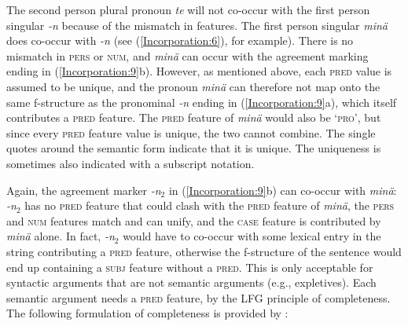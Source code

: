 \documentclass[output=paper,hidelinks]{langscibook}
\begin{document}
 \ea
 \ea\label{Incorporation:8} 
   \ex \label{8a}
\z
\z
The  second person plural pronoun \textit{te}  will not co-occur  with the  first  person  singular \textit{-n}  because of the mismatch in   features.    The first person  singular  \textit{min\"{a}} does co-occur  with \textit{-n}  (see  (\ref{Incorporation:6}), for example). There is no mismatch  in \textsc{pers}  or  \textsc{num}, and \textit{min\"{a}} can occur with   the agreement marking ending in (\ref{Incorporation:9}b).   However,    as mentioned above,  each \textsc{pred}  value    is  assumed to be unique, and  the pronoun  \textit{min\"{a}} can therefore not  map onto  the same  f-structure  as  the pronominal \textit{-n}  ending in (\ref{Incorporation:9}a), which  itself  contributes a \textsc{pred} feature.   The \textsc{pred} feature  of  \textit{min\"{a}}  would also  be \textsc{`pro'}, but   since every \textsc{pred} feature value is   unique,   the two cannot combine. The single quotes around the semantic form indicate that it is unique. The  uniqueness is sometimes also indicated  with a subscript notation.  


Again, the  agreement marker   \textit{-n}$_2$  in (\ref{Incorporation:9}b)  can co-occur with \textit{min\"{a}}:   \textit{-n}$_2$  has no  \textsc{pred} feature that could clash with the  \textsc{pred} feature of \textit{min\"{a}},   the  \textsc{pers} and \textsc{num}  features  match and  can unify, and the \textsc{case} feature is contributed by \textit{min\"{a}}  alone.
In fact,  \textit{-n}$_2$    would  have to co-occur with  some  lexical entry in  the string   contributing a \textsc{pred} feature, otherwise the f-structure of the  sentence would end up containing  a \textsc{subj} feature  without  a \textsc{pred}.  This  is  only acceptable for syntactic  arguments that are not semantic arguments (e.g., expletives).     Each semantic argument needs a \textsc{pred} feature, by the     LFG principle of completeness.   The  following formulation  of completeness is provided by \citet[62]{BresnanEtAl2016}:
  
\end{document}

